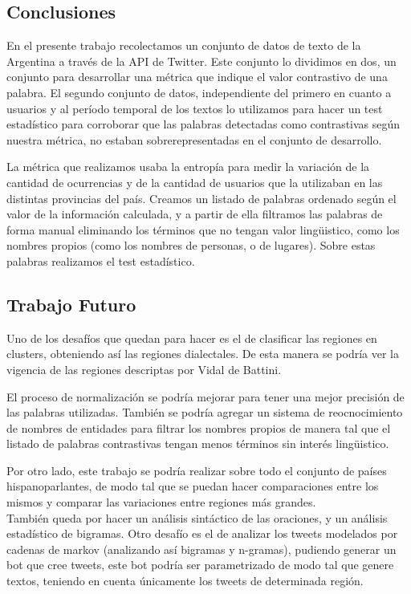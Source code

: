 
\subsection{Conclusiones}
En el presente trabajo recolectamos un conjunto de datos de texto de la Argentina a través de la API de Twitter. Este conjunto lo dividimos en dos, un conjunto para desarrollar una métrica que indique el valor contrastivo de una palabra. El segundo conjunto de datos, independiente del primero en cuanto a usuarios y al período temporal de los textos lo utilizamos para hacer un test estadístico para corroborar que las palabras detectadas como contrastivas según nuestra métrica, no estaban sobrerepresentadas en el conjunto de desarrollo.

La métrica que realizamos usaba la entropía para medir la variación de la cantidad de ocurrencias y de la cantidad de usuarios que la utilizaban en las distintas provincias del país. Creamos un listado de palabras ordenado según el valor de la información calculada, y a partir de ella filtramos las palabras de forma manual eliminando los términos que no tengan valor lingüistico, como los nombres propios (como los nombres de personas, o de lugares). Sobre estas palabras realizamos el test estadístico. 

\subsection{Trabajo Futuro}


Uno de los desafíos que quedan para hacer es el de clasificar las regiones en clusters, obteniendo así las regiones dialectales. De esta manera se podría ver la vigencia de las regiones descriptas por Vidal de Battini. %

El proceso de normalización se podría mejorar para tener una mejor precisión de las palabras utilizadas. También se podría agregar un sistema de reocnocimiento de nombres de entidades para filtrar los nombres propios de manera tal que el listado de palabras contrastivas tengan menos términos sin interés lingüistico.

Por otro lado, este trabajo se podría realizar sobre todo el conjunto de países hispanoparlantes, de modo tal que se puedan hacer comparaciones entre los mismos y comparar las variaciones entre regiones más grandes.\\

También queda por hacer un análisis sintáctico de las oraciones, y un análisis estadístico de bigramas.
Otro desafío es el de analizar los tweets modelados por cadenas de markov (analizando así bigramas y n-gramas), pudiendo generar un bot que cree tweets, este bot podría ser parametrizado de modo tal que genere textos, teniendo en cuenta únicamente los tweets de determinada región.

